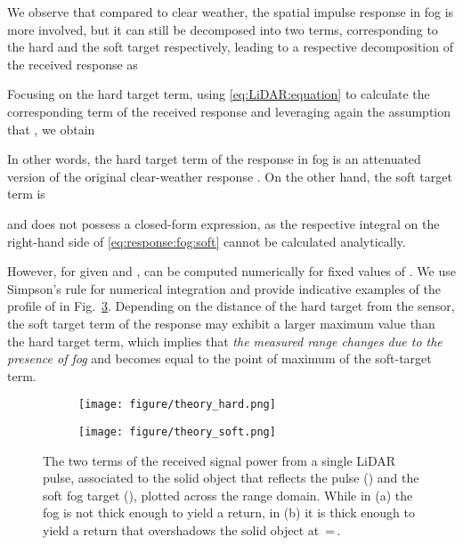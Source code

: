 \documentclass[10pt,twocolumn,letterpaper]{article}
\begin{document}
We observe that compared to clear weather, the spatial impulse response in fog is more involved, but it can still be decomposed into two terms, corresponding to the hard and the soft target respectively, leading to a respective decomposition of the received response as

Focusing on the hard target term, using \eqref{eq:LiDAR:equation} to calculate the corresponding term of the received response  and leveraging again the assumption that , we obtain 
{\scriptsize

}In other words, the hard target term of the response in fog is an attenuated version of the original clear-weather response . On the other hand, the soft target term is 
{\scriptsize

}and does not possess a closed-form expression, as the respective integral  on the right-hand side of \eqref{eq:response:fog:soft} cannot be calculated analytically. 

However, for given  and ,  can be computed numerically for fixed values of . We use Simpson's  rule for numerical integration and provide indicative examples of the profile of  in Fig.~\ref{fig:theory}. Depending on the distance of the hard target from the sensor, the soft target term of the response may exhibit a larger maximum value than the hard target term, which implies that \emph{the measured range changes due to the presence of fog} and becomes equal to the point of maximum of the soft-target term.

\begin{figure}
     \centering
     \begin{subfigure}[b]{0.49\linewidth}
         \centering
         \texttt{[image: figure/theory\_hard.png]}
         \caption{}
         \label{fig:theory_hard}
     \end{subfigure}
     \hfill
     \begin{subfigure}[b]{0.49\linewidth}
         \centering
         \texttt{[image: figure/theory\_soft.png]}
         \caption{}
         \label{fig:theory_soft}
     \end{subfigure}
     \caption{The two terms of the received signal power  from a single LiDAR pulse, associated to the solid object that reflects the pulse () and the soft fog target (), plotted across the range domain. While in (a) the fog is not thick enough to yield a return, in (b) it is thick enough to yield a return that overshadows the solid object at \,=\,.}
     \label{fig:theory}
\end{figure}
\end{document}
